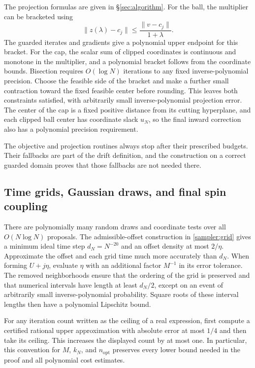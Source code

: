 \documentclass[11pt,reqno]{amsart}
\begin{document}
The projection formulas are given in \S\ref{sec:algorithm}. For the ball, the multiplier can be bracketed using
\[
 \|z(\lambda)-c_j\|\le\frac{\|v-c_j\|}{1+\lambda}.
\]
The guarded iterates and gradients give a polynomial upper endpoint for this bracket. For the cap, the scalar sum of clipped coordinates is continuous and monotone in the multiplier, and a polynomial bracket follows from the coordinate bounds. Bisection requires $O(\log N)$ iterations to any fixed inverse-polynomial precision. Choose the feasible side of the bracket and make a further small contraction toward the fixed feasible center before rounding. This leaves both constraints satisfied, with arbitrarily small inverse-polynomial projection error. The center of the cap is a fixed positive distance from its cutting hyperplane, and each clipped ball center has coordinate slack $u_N$, so the final inward correction also has a polynomial precision requirement.

The objective and projection routines always stop after their prescribed budgets. Their fallbacks are part of the drift definition, and the construction on a correct guarded domain proves that those fallbacks are not needed there.

\subsection{Time grids, Gaussian draws, and final spin coupling}

There are polynomially many random draws and coordinate tests over all $O(N\log N)$ proposals. The admissible-offset construction in \eqref{sampler:grid} gives a minimum ideal time step $d_N=N^{-20}$ and an offset density at most $2/\eta$. Approximate the offset and each grid time much more accurately than $d_N$. When forming $U+j\eta$, evaluate $\eta$ with an additional factor $M^{-1}$ in its error tolerance. The removed neighborhoods ensure that the ordering of the grid is preserved and that numerical intervals have length at least $d_N/2$, except on an event of arbitrarily small inverse-polynomial probability. Square roots of these interval lengths then have a polynomial Lipschitz bound.

For any iteration count written as the ceiling of a real expression, first compute a certified rational upper approximation with absolute error at most $1/4$ and then take its ceiling. This increases the displayed count by at most one. In particular, this convention for $M$, $k_N$, and $n_{\mathrm{opt}}$ preserves every lower bound needed in the proof and all polynomial cost estimates.
\end{document}
